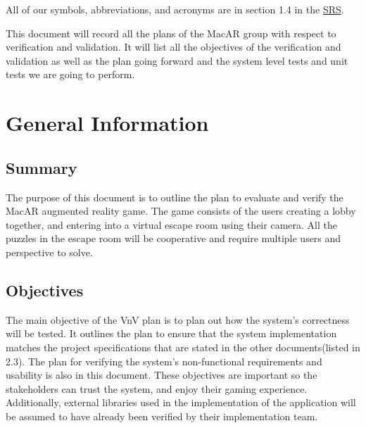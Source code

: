 \documentclass[12pt, titlepage]{article}
\begin{document}
All of our symbols, abbreviations, and acronyms are in section 1.4 in the  \href{https://github.com/SammyG7/Mac-AR/blob/main/docs/SRS/SRS.pdf}{SRS}.

\newpage


This document will record all the plans of the MacAR group with respect to verification and validation. It will list all the objectives of the verification and validation as well as the plan going forward and the system level tests and unit tests we are going to perform.  

\section{General Information}

\subsection{Summary}

The purpose of this document is to outline the plan to evaluate and verify the MacAR augmented reality game. The game consists of the users creating a lobby together, and entering into a virtual escape room using their camera. All the puzzles in the escape room will be cooperative and require multiple users and perspective to solve. 

\subsection{Objectives}

The main objective of the VnV plan is to plan out how the system's correctness will be tested. It outlines the plan to ensure that the system implementation matches the project specifications that are stated in the other documents(listed in 2.3). The plan for verifying the system's non-functional requirements and usability is also in this document. These objectives are important so the stakeholders can trust the system, and enjoy their gaming experience. Additionally, external libraries used in the implementation of the application will be assumed to have already been verified by their implementation team.
\end{document}
